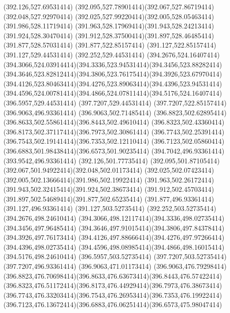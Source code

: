 {{	\lineto(392.126,527.69531414)
	\curveto(392.095,527.78901414)(392.067,527.86719414)(392.048,527.92970414)
	\curveto(392.025,527.99220414)(392.005,528.05463414)(391.986,528.11719414)
	\curveto(391.963,528.17969414)(391.943,528.24213414)(391.924,528.30470414)
	\curveto(391.912,528.37500414)(391.897,528.46485414)(391.877,528.57031414)
	\lineto(391.877,522.85157414)
	\lineto(391.127,522.85157414)
	\lineto(391.127,529.44531414)
	\lineto(392.252,529.44531414)
	\lineto(394.2676,524.16407414)
	\curveto(394.3066,524.03914414)(394.3336,523.94531414)(394.3456,523.88282414)
	\curveto(394.3646,523.82812414)(394.3806,523.76175414)(394.3926,523.67970414)
	\curveto(394.4126,523.80463414)(394.4276,523.89063414)(394.4396,523.94531414)
	\curveto(394.4596,524.00781414)(394.4866,524.07811414)(394.5176,524.16407414)
	\lineto(396.5957,529.44531414)
	\lineto(397.7207,529.44531414)
	\lineto(397.7207,522.85157414)
	\closepath
	\moveto(396.9063,496.93361414)
	\lineto(396.9063,502.71485414)
	\curveto(396.8823,502.62895414)(396.8633,502.55861414)(396.8443,502.49610414)
	\curveto(396.8323,502.43360414)(396.8173,502.37117414)(396.7973,502.30861414)
	\curveto(396.7743,502.25391414)(396.7543,502.19141414)(396.7353,502.12110414)
	\curveto(396.7123,502.05860414)(396.6883,501.98438414)(396.6573,501.90235414)
	\lineto(394.7042,496.93361414)
	\lineto(393.9542,496.93361414)
	\lineto(392.126,501.77735414)
	\curveto(392.095,501.87105414)(392.067,501.94922414)(392.048,502.01173414)
	\curveto(392.025,502.07423414)(392.005,502.13666414)(391.986,502.19922414)
	\curveto(391.963,502.26172414)(391.943,502.32415414)(391.924,502.38673414)
	\curveto(391.912,502.45703414)(391.897,502.54689414)(391.877,502.65235414)
	\lineto(391.877,496.93361414)
	\lineto(391.127,496.93361414)
	\lineto(391.127,503.52735414)
	\lineto(392.252,503.52735414)
	\lineto(394.2676,498.24610414)
	\curveto(394.3066,498.12117414)(394.3336,498.02735414)(394.3456,497.96485414)
	\curveto(394.3646,497.91015414)(394.3806,497.84378414)(394.3926,497.76173414)
	\curveto(394.4126,497.88666414)(394.4276,497.97266414)(394.4396,498.02735414)
	\curveto(394.4596,498.08985414)(394.4866,498.16015414)(394.5176,498.24610414)
	\lineto(396.5957,503.52735414)
	\lineto(397.7207,503.52735414)
	\lineto(397.7207,496.93361414)
	\closepath
	\moveto(396.9063,471.01173414)
	\lineto(396.9063,476.79298414)
	\curveto(396.8823,476.70698414)(396.8633,476.63673414)(396.8443,476.57422414)
	\curveto(396.8323,476.51172414)(396.8173,476.44929414)(396.7973,476.38673414)
	\curveto(396.7743,476.33203414)(396.7543,476.26953414)(396.7353,476.19922414)
	\curveto(396.7123,476.13672414)(396.6883,476.06251414)(396.6573,475.98047414)
}}
